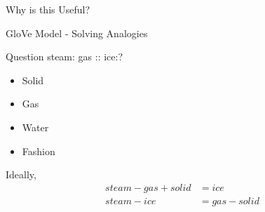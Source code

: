 \begin{frame}{Why is this Useful?}
\end{frame}
\begin{frame}{GloVe Model - Solving Analogies}
  \begin{exampleblock}{Question}
    steam: gas :: ice:?
    \pause
    \begin{itemize}[<+->]
    \item Solid
    \item Gas
    \item Water
    \item Fashion
    \end{itemize}
  \end{exampleblock}
  Ideally,
  \begin{align*} 
  steam - gas + solid &= ice \\
  steam - ice &= gas - solid \\
  \end{align*}
\end{frame}

